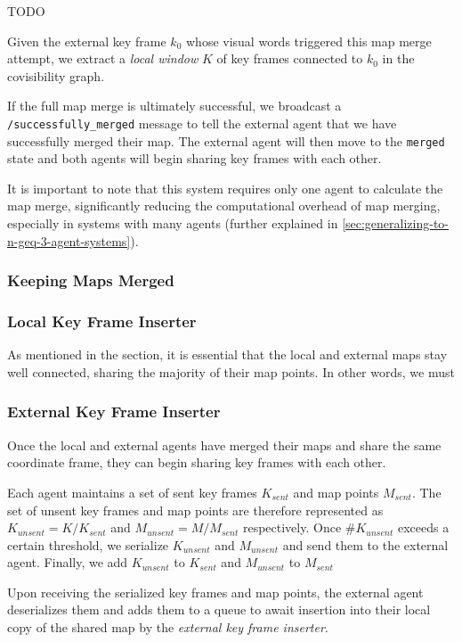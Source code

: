 TODO

Given the external key frame $k_0$ whose visual words triggered this map merge attempt, we extract a \textit{local window} $K$ of key frames connected to $k_0$ in the covisibility graph.

If the full map merge is ultimately successful, we broadcast a \texttt{/successfully\_merged} message to tell the external agent that we have successfully merged their map. The external agent will then move to the \texttt{merged} state and both agents will begin sharing key frames with each other.

It is important to note that this system requires only one agent to calculate the map merge, significantly reducing the computational overhead of map merging, especially in systems with many agents (further explained in \autoref{sec:generalizing-to-n-geq-3-agent-systems}).

\subsubsection{Keeping Maps Merged}

\subsubsection{Local Key Frame Inserter}
\label{sec:local-key-frame-inserter}
As mentioned in the  section, it is essential that the local and external maps stay well connected, sharing the majority of their map points. In other words, we must

\subsubsection{External Key Frame Inserter}
\label{sec:external-key-frame-inserter}
Once the local and external agents have merged their maps and share the same coordinate frame, they can begin sharing key frames with each other.

Each agent maintains a set of sent key frames $K_{sent}$ and map points $M_{sent}$. The set of unsent key frames and map points are therefore represented as $K_{unsent} = K / K_{sent}$ and $M_{unsent} = M / M_{sent}$ respectively. Once $\#K_{unsent}$ exceeds a certain threshold, we serialize $K_{unsent}$ and $M_{unsent}$ and send them to the external agent. Finally, we add $K_{unsent}$ to $K_{sent}$ and $M_{unsent}$ to $M_{sent}$

Upon receiving the serialized key frames and map points, the external agent deserializes them and adds them to a queue to await insertion into their local copy of the shared map by the \textit{external key frame inserter}.

